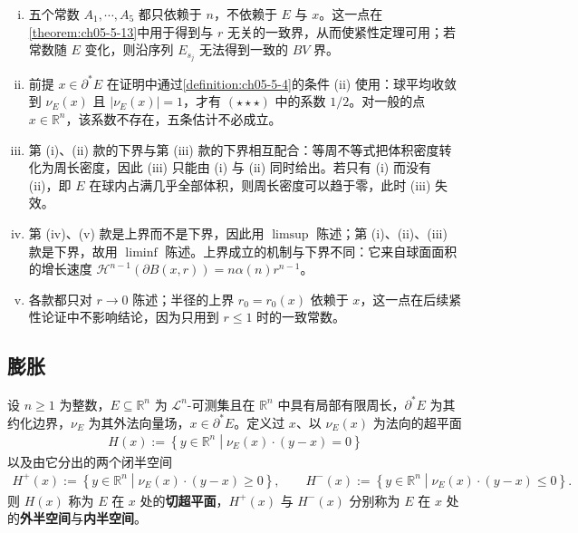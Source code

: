 \documentclass[../../main.tex]{subfiles}%
\begin{document}
\begin{remark}\label{remark:ch05-lem-5-3-条件}
\begin{enumerate}[(i)]
\item 五个常数 $A_1,\cdots,A_5$ 都只依赖于 $n$，不依赖于 $E$ 与 $x$。这一点在\cref{theorem:ch05-5-13}中用于得到与 $r$ 无关的一致界，从而使紧性定理可用；若常数随 $E$ 变化，则沿序列 $E_{s_j}$ 无法得到一致的 $BV$ 界。%
\item 前提 $x\in\partial^*E$ 在证明中通过\cref{definition:ch05-5-4}的条件 (ii) 使用：球平均收敛到 $\nu_E(x)$ 且 $\lvert\nu_E(x)\rvert=1$，才有 $(\star\star\star)$ 中的系数 $1/2$。对一般的点 $x\in\mathbb{R}^n$，该系数不存在，五条估计不必成立。%
\item 第 (i)、(ii) 款的下界与第 (iii) 款的下界相互配合：等周不等式把体积密度转化为周长密度，因此 (iii) 只能由 (i) 与 (ii) 同时给出。若只有 (i) 而没有 (ii)，即 $E$ 在球内占满几乎全部体积，则周长密度可以趋于零，此时 (iii) 失效。
\item 第 (iv)、(v) 款是上界而不是下界，因此用 $\limsup$ 陈述；第 (i)、(ii)、(iii) 款是下界，故用 $\liminf$ 陈述。上界成立的机制与下界不同：它来自球面面积的增长速度 $\mathcal{H}^{n-1}(\partial B(x,r))=n\alpha(n)r^{n-1}$。
\item 各款都只对 $r\to0$ 陈述；半径的上界 $r_0=r_0(x)$ 依赖于 $x$，这一点在后续紧性论证中不影响结论，因为只用到 $r\leqslant1$ 时的一致常数。
\end{enumerate}
\end{remark}

\subsection{膨胀}\label{subsection:ch05-07-2}

\begin{definition}[超平面与半空间]\label{definition:ch05-5-5}
设 $n\geqslant1$ 为整数，$E\subseteq\mathbb{R}^n$ 为 $\mathcal{L}^n$-可测集且在 $\mathbb{R}^n$ 中具有局部有限周长，$\partial^*E$ 为其约化边界，$\nu_E$ 为其外法向量场，$x\in\partial^*E$。定义过 $x$、以 $\nu_E(x)$ 为法向的超平面
\begin{align*}
H(x):=\left\{y\in\mathbb{R}^n\middle|\nu_E(x)\cdot(y-x)=0\right\}
\end{align*}
以及由它分出的两个闭半空间
\begin{align*}
H^+(x):=\left\{y\in\mathbb{R}^n\middle|\nu_E(x)\cdot(y-x)\geqslant0\right\},\qquad
H^-(x):=\left\{y\in\mathbb{R}^n\middle|\nu_E(x)\cdot(y-x)\leqslant0\right\}.
\end{align*}
则 $H(x)$ 称为 $E$ 在 $x$ 处的\textbf{切超平面}，$H^+(x)$ 与 $H^-(x)$ 分别称为 $E$ 在 $x$ 处的\textbf{外半空间}与\textbf{内半空间}。
\end{definition}
\end{document}

